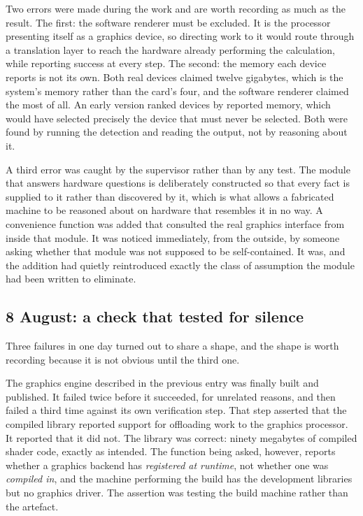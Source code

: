 \documentclass[11pt,a4paper]{article}
\begin{document}
Two errors were made during the work and are worth recording as much as the
result. The first: the software renderer must be excluded. It is the processor
presenting itself as a graphics device, so directing work to it would route
through a translation layer to reach the hardware already performing the
calculation, while reporting success at every step. The second: the memory each
device reports is not its own. Both real devices claimed twelve gigabytes, which
is the system's memory rather than the card's four, and the software renderer
claimed the most of all. An early version ranked devices by reported memory,
which would have selected precisely the device that must never be selected.
Both were found by running the detection and reading the output, not by
reasoning about it.

A third error was caught by the supervisor rather than by any test. The module
that answers hardware questions is deliberately constructed so that every fact
is supplied to it rather than discovered by it, which is what allows a
fabricated machine to be reasoned about on hardware that resembles it in no way.
A convenience function was added that consulted the real graphics interface from
inside that module. It was noticed immediately, from the outside, by someone
asking whether that module was not supposed to be self-contained. It was, and
the addition had quietly reintroduced exactly the class of assumption the module
had been written to eliminate.

\subsection{8 August: a check that tested for silence}

Three failures in one day turned out to share a shape, and the shape is worth
recording because it is not obvious until the third one.

The graphics engine described in the previous entry was finally built and
published. It failed twice before it succeeded, for unrelated reasons, and then
failed a third time against its own verification step. That step asserted that
the compiled library reported support for offloading work to the graphics
processor. It reported that it did not. The library was correct: ninety
megabytes of compiled shader code, exactly as intended. The function being
asked, however, reports whether a graphics backend has \emph{registered at
runtime}, not whether one was \emph{compiled in}, and the machine performing the
build has the development libraries but no graphics driver. The assertion was
testing the build machine rather than the artefact.
\end{document}
